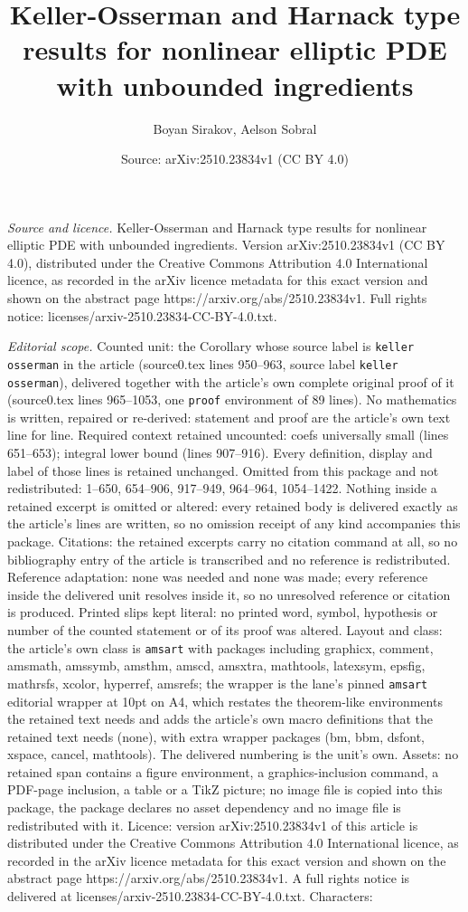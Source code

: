 \documentclass[10pt,a4paper]{amsart}
\title[Keller-Osserman and Harnack type results for nonlinear ellip]{Keller-Osserman and Harnack type results for nonlinear elliptic PDE with unbounded ingredients}
\author{Boyan Sirakov, Aelson Sobral}
\date{Source: arXiv:2510.23834v1 (CC BY 4.0)}
\begin{document}
\maketitle

\noindent\emph{Source and licence.} Keller-Osserman and Harnack type results for nonlinear elliptic PDE with unbounded ingredients. Version arXiv:2510.23834v1 (CC BY 4.0), distributed under the Creative Commons Attribution 4.0 International licence, as recorded in the arXiv licence metadata for this exact version and shown on the abstract page https://arxiv.org/abs/2510.23834v1. Full rights notice: licenses/arxiv-2510.23834-CC-BY-4.0.txt.\par\smallskip

\noindent\textit{Editorial scope.} Counted unit: the Corollary whose source label is \texttt{keller osserman} in the article (source0.tex lines 950--963, source label \texttt{keller osserman}), delivered together with the article's own complete original proof of it (source0.tex lines 965--1053, one \texttt{proof} environment of 89 lines). No mathematics is written, repaired or re-derived: statement and proof are the article's own text line for line. Required context retained uncounted: coefs universally small (lines 651--653); integral lower bound (lines 907--916). Every definition, display and label of those lines is retained unchanged. Omitted from this package and not redistributed: 1--650, 654--906, 917--949, 964--964, 1054--1422. Nothing inside a retained excerpt is omitted or altered: every retained body is delivered exactly as the article's lines are written, so no omission receipt of any kind accompanies this package. Citations: the retained excerpts carry no citation command at all, so no bibliography entry of the article is transcribed and no reference is redistributed. Reference adaptation: none was needed and none was made; every reference inside the delivered unit resolves inside it, so no unresolved reference or citation is produced. Printed slips kept literal: no printed word, symbol, hypothesis or number of the counted statement or of its proof was altered. Layout and class: the article's own class is \texttt{amsart} with packages including graphicx, comment, amsmath, amssymb, amsthm, amscd, amsxtra, mathtools, latexsym, epsfig, mathrsfs, xcolor, hyperref, amsrefs; the wrapper is the lane's pinned \texttt{amsart} editorial wrapper at 10pt on A4, which restates the theorem-like environments the retained text needs and adds the article's own macro definitions that the retained text needs (none), with extra wrapper packages (bm, bbm, dsfont, xspace, cancel, mathtools). The delivered numbering is the unit's own. Assets: no retained span contains a figure environment, a graphics-inclusion command, a PDF-page inclusion, a table or a TikZ picture; no image file is copied into this package, the package declares no asset dependency and no image file is redistributed with it. Licence: version arXiv:2510.23834v1 of this article is distributed under the Creative Commons Attribution 4.0 International licence, as recorded in the arXiv licence metadata for this exact version and shown on the abstract page https://arxiv.org/abs/2510.23834v1. A full rights notice is delivered at licenses/arxiv-2510.23834-CC-BY-4.0.txt. Characters: 
\end{document}
